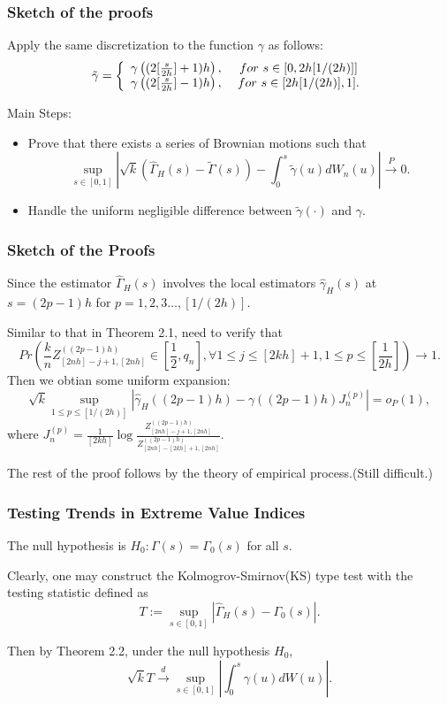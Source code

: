 \documentclass{beamer}
\newcommand{\suit}[1]{\left(#1\right)}
\newcommand{\abs}[1]{\left\vert#1\right\vert}
\begin{document}
\begin{frame}
    \frametitle{Sketch of the proofs}
Apply the same discretization to the function $\gamma$ as follows:
$$
\tilde{\gamma} =\left\{ \begin{array}[]{cc}
    \gamma\suit{(2[\frac{s}{2h}]+1)h}, & \ for \ s\in [0,2h[1/(2h)]]\\
    \gamma\suit{(2[\frac{s}{2h}]-1)h}, & \ for \ s\in [2h[1/(2h)],1].
\end{array}\right.
$$
\bigskip

Main Steps:
\begin{itemize}
    \item Prove that there exists a series of Brownian motions such that 
    $$
\sup_{s\in [0,1]} \abs{\sqrt{k}(\hat{\Gamma}_H(s)-\tilde{\Gamma}(s))-\int_{0}^s \tilde{\gamma}(u)dW_n(u)}\stackrel{P}{\to} 0.
    $$
    \item Handle the uniform negligible difference between $\tilde{\gamma}(\cdot)$ and $\gamma$.
\end{itemize}

\end{frame}


\begin{frame}
    \frametitle{Sketch of the Proofs}
Since the estimator $\hat{\Gamma}_H(s)$ involves the local estimators $\hat{\gamma}_H(s)$ at $s=(2p-1)h$ for $p=1,2,3\dots,[1/(2h)]$.

Similar to that in Theorem 2.1, need to verify that 
{\color{blue}
$$
Pr\suit{\frac{k}{n} Z_{[2nh]-j+1,[2nh]}^{((2p-1)h)} \in [\frac{1}{2},q_n], \forall 1\le j \le [2kh]+1,1\le p\le [\frac{1}{2h}]} \to 1.
$$}
Then we obtian some uniform expansion:
$$
\sqrt{k} \sup_{1\le p \le [1/(2h)]} \abs{\hat{\gamma}_H((2p-1)h)-\gamma((2p-1)h)J_n^{(p)}}=o_P(1),
$$
where $J_n^{(p)}=\frac{1}{[2kh]}\log \frac{Z_{[2nh]-j+1,[2nh]}^{((2p-1)h)}}{Z_{[2nh]-[2kh]+1,[2nh]}^{((2p-1)h)}}.$

The rest of the proof follows by the theory of  empirical process.(Still difficult.)

    

\end{frame}

\begin{frame}
    \frametitle{Testing Trends in Extreme Value Indices}
The null hypothesis is $H_0: \Gamma(s)=\Gamma_0(s)$ for all $s$.

\bigskip

Clearly, one may construct the Kolmogrov-Smirnov(KS) type test with the testing statistic defined as 
$$
T:=\sup_{s\in [0,1]} \abs{\hat{\Gamma}_H(s)-\Gamma_0(s)}.
$$

Then by Theorem 2.2, under the null hypothesis $H_0$,
$$
\sqrt{k} T \stackrel{d}{\rightarrow} \sup _{s \in[0,1]}\left|\int_{0}^{s} \gamma(u) d W(u)\right|.
$$
\end{frame}
\end{document}
